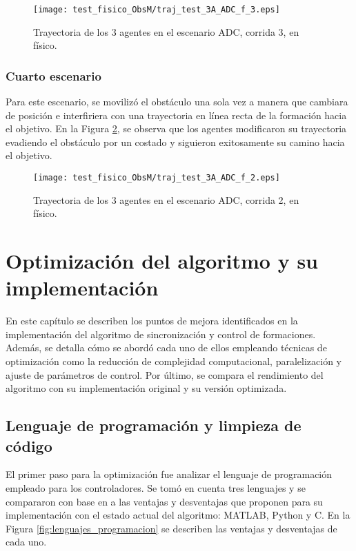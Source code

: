 \begin{figure}[H]
	\centering
	\texttt{[image: test\_fisico\_ObsM/traj\_test\_3A\_ADC\_f\_3.eps]}
	\caption{Trayectoria de los 3 agentes en el escenario ADC, corrida 3, en físico.}
	\label{fig:traj_test_3A_ADC_f_3}
\end{figure}

\subsection{Cuarto escenario}
Para este escenario, se movilizó el obstáculo una sola vez a manera que cambiara de posición e interfiriera con una trayectoria en línea recta de la formación hacia el objetivo. En la Figura \ref{fig:traj_test_3A_ADC_f_2}, se observa que los agentes modificaron su trayectoria evadiendo el obstáculo por un costado y siguieron exitosamente su camino hacia el objetivo.

\begin{figure}[H]
	\centering
	\texttt{[image: test\_fisico\_ObsM/traj\_test\_3A\_ADC\_f\_2.eps]}
	\caption{Trayectoria de los 3 agentes en el escenario ADC, corrida 2, en físico.}
	\label{fig:traj_test_3A_ADC_f_2}
\end{figure}


\chapter{Optimización del algoritmo y su implementación}\label{cap:optimizacion}
En este capítulo se describen los puntos de mejora identificados en la implementación del algoritmo de sincronización y control de formaciones. Además, se detalla cómo se abordó cada uno de ellos empleando técnicas de optimización como la reducción de complejidad computacional, paralelización y ajuste de parámetros de control. Por último, se compara el rendimiento del algoritmo con su implementación original y su versión optimizada.

\section{Lenguaje de programación y limpieza de código}
El primer paso para la optimización fue analizar el lenguaje de programación empleado para los controladores. Se tomó en cuenta tres lenguajes y se compararon con base en a las ventajas y desventajas que proponen para su implementación con el estado actual del algoritmo: MATLAB, Python y C. En la Figura \ref{fig:lenguajes_programacion} se describen las ventajas y desventajas de cada uno.

